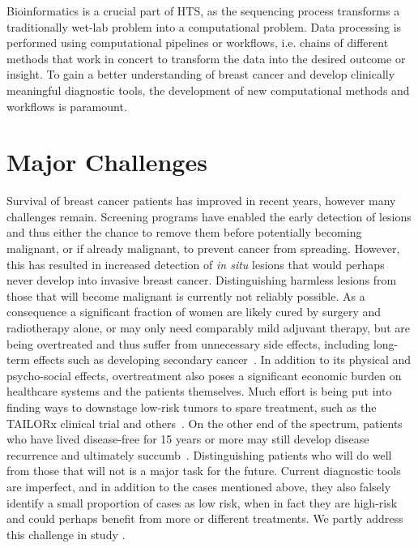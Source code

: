 \documentclass[11pt]{book}
\begin{document}
Bioinformatics is a crucial part of HTS, as the sequencing process transforms a traditionally wet-lab problem into a computational problem. Data processing is performed using computational pipelines or workflows, i.e. chains of different methods that work in concert to transform the data into the desired outcome or insight. To gain a better understanding of breast cancer and develop clinically meaningful diagnostic tools, the development of new computational methods and workflows is paramount.



%
%
\section{Major Challenges}
\label{sec:major-challenges}

Survival of breast cancer patients has improved in recent years, however many challenges remain. Screening programs have enabled the early detection of lesions and thus either the chance to remove them before potentially becoming malignant, or if already malignant, to prevent cancer from spreading. However, this has resulted in increased detection of \textit{in situ} lesions that would perhaps never develop into invasive breast cancer. Distinguishing harmless lesions from those that will become malignant is currently not reliably possible. As a consequence a significant fraction of women are likely cured by surgery and radiotherapy alone, or may only need comparably mild adjuvant therapy, but are being overtreated and thus suffer from unnecessary side effects, including long-term effects such as developing secondary cancer~\cite{Holland-Frei:9th}. In addition to its physical and psycho-social effects, overtreatment also poses a significant economic burden on healthcare systems \cite{Masood:2013} and the patients themselves. Much effort is being put into finding ways to downstage low-risk tumors to spare treatment, such as the TAILORx clinical trial and others~\cite{Gluz:2020}.
On the other end of the spectrum, patients who have lived disease-free for 15 years or more may still develop disease recurrence and ultimately succumb~\cite{Brenner:2002}. Distinguishing patients who will do well from those that will not is a major task for the future.
Current diagnostic tools are imperfect, and in addition to the cases mentioned above, they also falsely identify a small proportion of cases as low risk, when in fact they are high-risk and could perhaps benefit from more or different treatments. We partly address this challenge in study \III.
\end{document}
